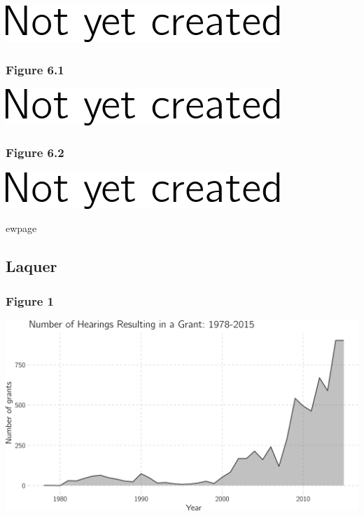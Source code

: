 \documentclass[]{article}
\begin{document}
\includegraphics{figures/frankenreiter5_2-1.png}

\subsubsection{Figure 6.1}\label{figure-6.1}

\includegraphics{figures/frankenreiter6_1-1.png}

\subsubsection{Figure 6.2}\label{figure-6.2}

\includegraphics{figures/frankenreiter6_2-1.png}

ewpage

\subsection{Laquer}\label{laquer}

\subsubsection{Figure 1}\label{figure-1-1}

\includegraphics{figures/laquer1-1.png}
\end{document}
